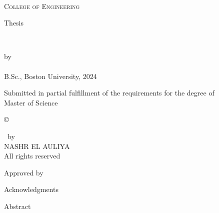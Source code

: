\begin{titlepage}
    \begin{center}
        \begin{doublespace}
             \\
            \textsc{\Large College of Engineering} \\
        \end{doublespace}
        \vfill
        {\large Thesis}\\
        \vfill
        \begin{spacing}{1.5}
            \textbf{\textsc{\huge\thesisName}} \\
        \end{spacing}
        \vfill
        by \\
        \vfill
        \textbf{\LARGE\authorName} \\ \vspace{2.5pt}
        {\Large B.Sc., Boston University, 2024} \\
        \vfill
        \begin{doublespace}
            Submitted in partial fulfillment of the requirements for the degree of\\
            \large Master of Science\\
            \the\year
        \end{doublespace}
    \end{center}
\end{titlepage}

\thispagestyle{empty}
\null\vfill
\begin{flushright}
    \begin{singlespace}
        \copyright \hspace{1ex}
        \begin{minipage}[t]{3in}
            \the\year \ by\\
            NASHR EL AULIYA\\
            All rights reserved
        \end{minipage} 
    \end{singlespace}
\end{flushright}
\newpage

\thispagestyle{empty}
Approved by
\newpage

Acknowledgments\\

\newpage

Abstract\\

\newpage

\tableofcontents
\cleardoublepage


